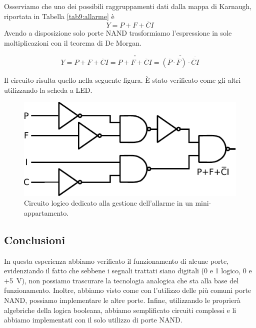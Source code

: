 Osserviamo che uno dei possibili raggruppamenti dati dalla mappa di Karnaugh, riportata in Tabella \ref{tab9:allarme} è
$$Y=P+F+\overline C I$$
Avendo a disposizione solo porte NAND trasformiamo l'espressione in sole moltiplicazioni con il teorema di De Morgan.

$$Y=P+F+\overline C I=\overline{\overline{P+F+\overline C I}}=\overline{(\overline P \cdot \overline F) \cdot \overline{\overline C I}}$$ 

Il circuito risulta quello nella seguente figura.
È stato verificato come gli altri utilizzando la scheda a LED.

\begin{figure}[htpc]
\centering
\includegraphics[width=.45\textwidth]{../E09/latex/allarme.pdf}
\caption{Circuito logico dedicato alla gestione dell'allarme in un mini-appartamento.}
\label{cir9:allarme}
\end{figure}

\subsection*{Conclusioni}
In questa esperienza abbiamo verificato il funzionamento di alcune porte, evidenziando il fatto che sebbene i segnali trattati siano digitali (0 e 1 logico, 0 e $+$\SI{5}{\V}), non possiamo trascurare la tecnologia analogica che sta alla base del funzionamento.
Inoltre, abbiamo visto come con l'utilizzo delle più comuni porte NAND, possiamo implementare le altre porte.
Infine, utilizzando le proprierà algebriche della logica booleana, abbiamo semplificato circuiti complessi e li abbiamo implementati con il solo utilizzo di porte NAND.
